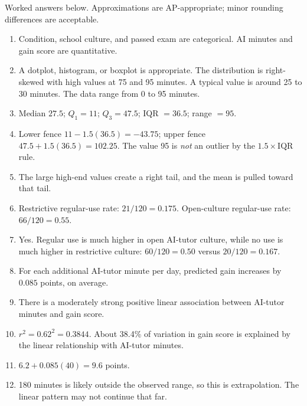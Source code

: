 \documentclass[11pt]{article}
\begin{document}
\begin{keybox}
Worked answers below. Approximations are AP-appropriate; minor
rounding differences are acceptable.
\end{keybox}

\begin{enumerate}[leftmargin=*]
\item Condition, school culture, and passed exam are categorical.
AI minutes and gain score are quantitative.

\item A dotplot, histogram, or boxplot is appropriate. The
distribution is right-skewed with high values at 75 and 95
minutes. A typical value is around 25 to 30 minutes. The data
range from 0 to 95 minutes.

\item Median $27.5$; $Q_1 = 11$; $Q_3 = 47.5$; IQR $= 36.5$; range $= 95$.

\item Lower fence $11 - 1.5(36.5) = -43.75$; upper fence
$47.5 + 1.5(36.5) = 102.25$. The value 95 is \emph{not} an outlier
by the $1.5 \times \text{IQR}$ rule.

\item The large high-end values create a right tail, and the mean is
pulled toward that tail.

\item Restrictive regular-use rate: $21/120 = 0.175$. Open-culture
regular-use rate: $66/120 = 0.55$.

\item Yes. Regular use is much higher in open AI-tutor culture, while
no use is much higher in restrictive culture: $60/120 = 0.50$
versus $20/120 = 0.167$.

\item For each additional AI-tutor minute per day, predicted gain
increases by $0.085$ points, on average.

\item There is a moderately strong positive linear association
between AI-tutor minutes and gain score.

\item $r^2 = 0.62^2 = 0.3844$. About 38.4\% of variation in gain
score is explained by the linear relationship with AI-tutor
minutes.

\item $6.2 + 0.085(40) = 9.6$ points.

\item 180 minutes is likely outside the observed range, so this is
extrapolation. The linear pattern may not continue that far.


\end{enumerate}
\end{document}
